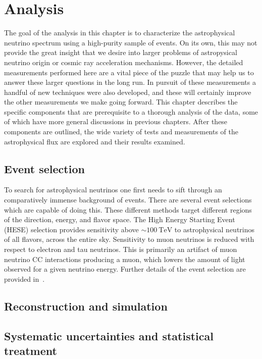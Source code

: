 \chapter{Analysis}\label{chapter:analysis}

The goal of the analysis in this chapter is to characterize the astrophysical neutrino spectrum using a high-purity sample of events.
On its own, this may not provide the great insight that we desire into larger problems of astropysical neutrino origin or cosmic ray acceleration mechanisms.
However, the detailed measurements performed here are a vital piece of the puzzle that may help us to answer these larger questions in the long run.
In pursuit of these measurements a handful of new techniques were also developed, and these will certainly improve the other measurements we make going forward.
This chapter describes the specific components that are prerequisite to a thorough analysis of the data, some of which have more general discussions in previous chapters.
After these components are outlined, the wide variety of tests and measurements of the astrophysical flux are explored and their results examined.

\section{Event selection}
To search for astrophysical neutrinos one first needs to sift through an comparatively immense background of events.
There are several event selections which are capable of doing this.
These different methods target different regions of the direction, energy, and flavor space.
The High Energy Starting Event (HESE) selection provides sensitivity above $\sim\SI{100}\TeV$ to astrophysical neutrinos of all flavors, across the entire sky.
Sensitivity to muon neutrinos is reduced with respect to electron and tau neutrinos.
This is primarily an artifact of muon neutrino CC interactions producing a muon, which lowers the amount of light observed for a given neutrino energy.
Further details of the event selection are provided in~.

\section{Reconstruction and simulation}
\begingroup
\graphicspath{{results/HESE_Final_Paper/}}

\endgroup

\section{Systematic uncertainties and statistical treatment\label{sec:uncertainties}}
